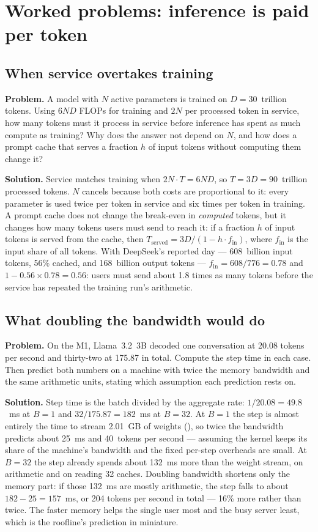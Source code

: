 \section{Worked problems: inference is paid per token}

\subsection{When service overtakes training}
\textbf{Problem.} A model with $N$ active parameters is trained on
$D = 30$~trillion tokens. Using $6ND$ FLOPs for training and $2N$ per processed
token in service, how many tokens must it process in service before inference
has spent as much compute as training? Why does the answer not depend on $N$,
and how does a prompt cache that serves a fraction $h$ of input tokens without
computing them change it?

\textbf{Solution.} Service matches training when $2N \cdot T = 6ND$, so
$T = 3D = 90$~trillion processed tokens. $N$ cancels because both costs are
proportional to it: every parameter is used twice per token in service and six
times per token in training. A prompt cache does not change the break-even in
\emph{computed} tokens, but it changes how many tokens users must send to reach
it: if a fraction $h$ of input tokens is served from the cache, then
$T_{\text{served}} = 3D / (1 - h \cdot f_{\text{in}})$, where $f_{\text{in}}$ is
the input share of all tokens. With DeepSeek's reported day --- 608~billion
input tokens, 56\% cached, and 168~billion output tokens ---
$f_{\text{in}} = 608/776 = 0.78$ and $1 - 0.56 \times 0.78 = 0.56$: users must
send about 1.8 times as many tokens before the service has repeated the
training run's arithmetic.

\subsection{What doubling the bandwidth would do}
\textbf{Problem.} On the M1, Llama~3.2~3B decoded one conversation at
20.08 tokens per second and thirty-two at 175.87 in total. Compute the step time
in each case. Then predict both numbers on a machine with twice the memory
bandwidth and the same arithmetic units, stating which assumption each
prediction rests on.

\textbf{Solution.} Step time is the batch divided by the aggregate rate:
$1/20.08 = 49.8$~ms at $B = 1$ and $32/175.87 = 182$~ms at $B = 32$. At
$B = 1$ the step is almost entirely the time to stream 2.01~GB of weights
(), so twice the bandwidth predicts about 25~ms and
40~tokens per second --- assuming the kernel keeps its share of the machine's
bandwidth and the fixed per-step overheads are small. At $B = 32$ the step
already spends about 132~ms more than the weight stream, on arithmetic and on
reading 32 caches. Doubling bandwidth shortens only the memory part: if those
132~ms are mostly arithmetic, the step falls to about $182 - 25 = 157$~ms, or
204 tokens per second in total --- 16\% more rather than twice. The faster memory helps the single user most and the busy server
least, which is the roofline's prediction in miniature.


